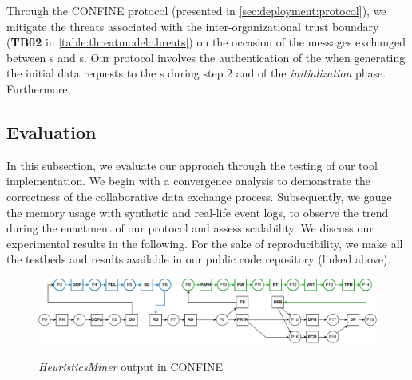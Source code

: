 \begin{newj}
Through the CONFINE protocol (presented in \cref{sec:deployment:protocol}), we mitigate the threats associated with the inter-organizational trust boundary (\textbf{TB02} in \cref{table:threatmodel:threats}) on the occasion of the messages exchanged between s and s. Our protocol involves the authentication of the  when generating the initial data requests to the s during step 2 and of the \emph{initialization} phase. Furthermore,  
\end{newj}
\subsection{Evaluation}
In this subsection, we evaluate our approach through the testing of our tool implementation. %
We begin with a convergence analysis %
to demonstrate the correctness of the collaborative data exchange process. Subsequently, we %
gauge the memory usage with synthetic and real-life event logs, to observe the trend during the enactment of our protocol and assess scalability. We discuss our experimental results in the following.
For the sake of reproducibility, we make all the testbeds and results available in our public code repository (linked above).
%
\begin{figure}[t]
	\includegraphics[width=1\linewidth]{content/figures/mergedDep1.pdf}\label{fig:wfnet:d}
	\caption[HeuristicsMiner output]{\emph{HeuristicsMiner} output in CONFINE}
	\label{fig:wfnet}
\end{figure}    


